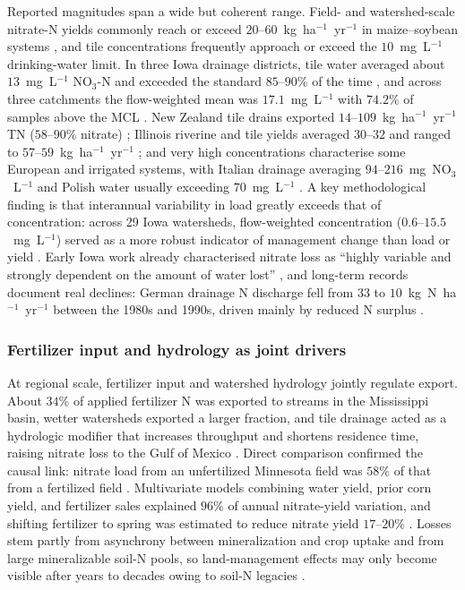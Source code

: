 \documentclass[11pt]{article}
\begin{document}
Reported magnitudes span a wide but coherent range. Field- and
watershed-scale nitrate-N yields commonly reach or exceed
$20$--$60$~kg~ha$^{-1}$~yr$^{-1}$ in maize--soybean systems
\parencite{Gentry2009,Gentry2014,Dattamudi2020,Tomer2008}, and tile
concentrations frequently approach or exceed the $10$~mg~L$^{-1}$
drinking-water limit. In three Iowa drainage districts, tile water averaged
about $13$~mg~L$^{-1}$ NO$_3$-N and exceeded the standard $85$--$90\%$ of
the time \parencite{Schilling2012b}, and across three catchments the
flow-weighted mean was $17.1$~mg~L$^{-1}$ with $74.2\%$ of samples above the
MCL \parencite{Ikenberry2014}. New Zealand tile drains exported
$14$--$109$~kg~ha$^{-1}$~yr$^{-1}$ TN ($58$--$90\%$ nitrate)
\parencite{Tanner2011}; Illinois riverine and tile yields averaged
$30$--$32$ and ranged to $57$--$59$~kg~ha$^{-1}$~yr$^{-1}$
\parencite{Gentry2014}; and very high concentrations characterise some
European and irrigated systems, with Italian drainage averaging
$94$--$216$~mg~NO$_3$~L$^{-1}$ \parencite{ROSSI1991} and Polish water
usually exceeding $70$~mg~L$^{-1}$ \parencite{Dragon2016}. A key
methodological finding is that interannual variability in load greatly
exceeds that of concentration: across 29 Iowa watersheds, flow-weighted
concentration ($0.6$--$15.5$~mg~L$^{-1}$) served as a more robust indicator
of management change than load or yield \parencite{Danalatos2022}. Early
Iowa work already characterised nitrate loss as ``highly variable and
strongly dependent on the amount of water lost'' \parencite{BAKER1975}, and
long-term records document real declines: German drainage N discharge fell
from $33$ to $10$~kg~N~ha$^{-1}$~yr$^{-1}$ between the 1980s and 1990s,
driven mainly by reduced N surplus \parencite{Hirt2005b}.

\subsubsection{Fertilizer input and hydrology as joint drivers}

At regional scale, fertilizer input and watershed hydrology jointly
regulate export. About $34\%$ of applied fertilizer N was exported to
streams in the Mississippi basin, wetter watersheds exported a larger
fraction, and tile drainage acted as a hydrologic modifier that increases
throughput and shortens residence time, raising nitrate loss to the Gulf of
Mexico \parencite{Raymond2012}. Direct comparison confirmed the causal
link: nitrate load from an unfertilized Minnesota field was $58\%$ of that
from a fertilized field \parencite{Ghane2016b}. Multivariate models
combining water yield, prior corn yield, and fertilizer sales explained
$96\%$ of annual nitrate-yield variation, and shifting fertilizer to spring
was estimated to reduce nitrate yield $17$--$20\%$ \parencite{Gentry2014}.
Losses stem partly from asynchrony between mineralization and crop uptake
and from large mineralizable soil-N pools, so land-management effects may
only become visible after years to decades owing to soil-N legacies
\parencite{Cambardella1999,Bauwe2020}.
\end{document}

